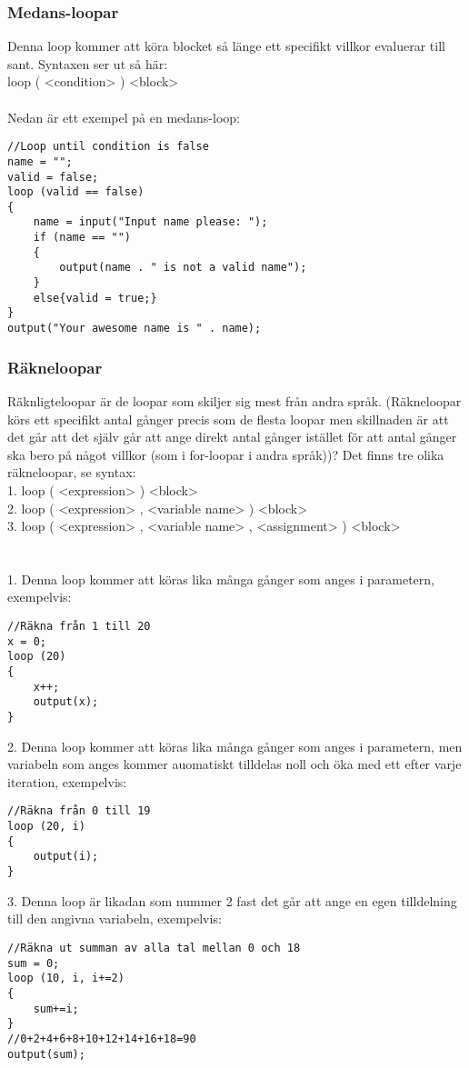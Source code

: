 \documentclass{TDP003mall}
\begin{document}
\subsubsection{Medans-loopar}
Denna loop kommer att köra blocket så länge ett specifikt villkor evaluerar till sant. Syntaxen ser ut så här:
\\
loop ( <condition> ) <block>
\\\\
Nedan är ett exempel på en medans-loop:
\begin{lstlisting}
//Loop until condition is false
name = "";
valid = false;
loop (valid == false)
{
	name = input("Input name please: ");
	if (name == "")
	{
		output(name . " is not a valid name");
	}
	else{valid = true;}
}
output("Your awesome name is " . name);
\end{lstlisting}

\subsubsection{Räkneloopar}
Räknligteloopar är de loopar som skiljer sig mest från andra språk. (Räkneloopar körs ett specifikt antal gånger precis som de flesta loopar men skillnaden är att det går att det själv går att ange direkt antal gånger istället för att antal gånger ska bero på något villkor (som i for-loopar i andra språk))?  Det finns tre olika räkneloopar, se syntax:
\\
1. loop ( <expression> ) <block>\\
2. loop ( <expression> , <variable name> ) <block> \\
3. loop ( <expression> , <variable name> , <assignment> ) <block> \\
\\\\
1. Denna loop kommer att köras lika många gånger som anges i parametern, exempelvis:
\begin{lstlisting}
//Räkna från 1 till 20
x = 0;
loop (20)
{
    x++;
    output(x);	
}
\end{lstlisting}
2. Denna loop kommer att köras lika många gånger som anges i parametern, men variabeln som anges kommer auomatiskt tilldelas noll och öka med ett efter varje iteration, exempelvis:
\begin{lstlisting}
//Räkna från 0 till 19
loop (20, i)
{
    output(i);	
}
\end{lstlisting}
3. Denna loop är likadan som nummer 2 fast det går att ange en egen tilldelning till den angivna variabeln, exempelvis:
\begin{lstlisting}
//Räkna ut summan av alla tal mellan 0 och 18
sum = 0;
loop (10, i, i+=2)
{
    sum+=i;
}
//0+2+4+6+8+10+12+14+16+18=90
output(sum);
\end{lstlisting}
\end{document}
